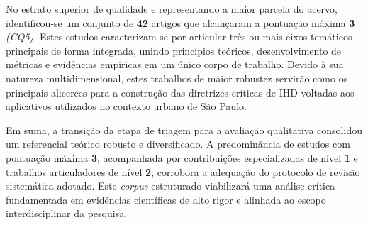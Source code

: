 \documentclass[
	12pt,				%
	oneside,			%
	a4paper,			%
	english,			%
	brazil				%
	]{abntex2ppgsi}
\begin{document}
    No estrato superior de qualidade e representando a maior parcela do acervo, identificou-se um conjunto de \textbf{42} artigos que alcançaram a pontuação máxima \textbf{3} \textit{(CQ5)}. Estes estudos caracterizam-se por articular três ou mais eixos temáticos principais de forma integrada, unindo princípios teóricos, desenvolvimento de métricas e evidências empíricas em um único corpo de trabalho. Devido à sua natureza multidimensional, estes trabalhos de maior robustez servirão como os principais alicerces para a construção das diretrizes críticas de IHD voltadas aos aplicativos utilizados no contexto urbano de São Paulo.

    Em suma, a transição da etapa de triagem para a avaliação qualitativa consolidou um referencial teórico robusto e diversificado. A predominância de estudos com pontuação máxima \textbf{3}, acompanhada por contribuições especializadas de nível \textbf{1} e trabalhos articuladores de nível \textbf{2}, corrobora a adequação do protocolo de revisão sistemática adotado. Este \textit{corpus} estruturado viabilizará uma análise crítica fundamentada em evidências científicas de alto rigor e alinhada ao escopo interdisciplinar da pesquisa.
    

\end{document}
